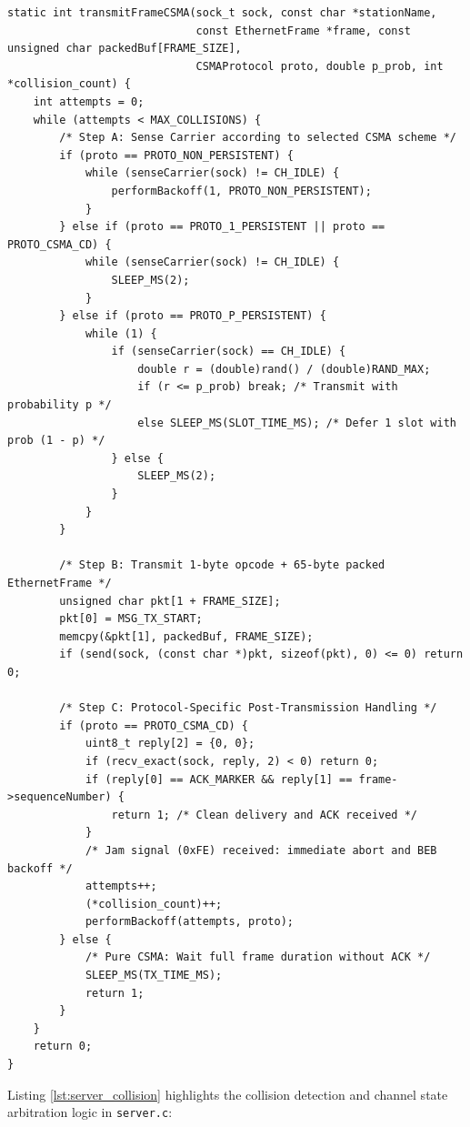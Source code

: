 \documentclass[11pt,a4paper]{article}
\begin{document}
\begin{lstlisting}[caption={Carrier sensing and CSMA transmission arbitration (\texttt{sender.c}).}, label={lst:csma_sender}]
static int transmitFrameCSMA(sock_t sock, const char *stationName,
                             const EthernetFrame *frame, const unsigned char packedBuf[FRAME_SIZE],
                             CSMAProtocol proto, double p_prob, int *collision_count) {
    int attempts = 0;
    while (attempts < MAX_COLLISIONS) {
        /* Step A: Sense Carrier according to selected CSMA scheme */
        if (proto == PROTO_NON_PERSISTENT) {
            while (senseCarrier(sock) != CH_IDLE) {
                performBackoff(1, PROTO_NON_PERSISTENT);
            }
        } else if (proto == PROTO_1_PERSISTENT || proto == PROTO_CSMA_CD) {
            while (senseCarrier(sock) != CH_IDLE) {
                SLEEP_MS(2);
            }
        } else if (proto == PROTO_P_PERSISTENT) {
            while (1) {
                if (senseCarrier(sock) == CH_IDLE) {
                    double r = (double)rand() / (double)RAND_MAX;
                    if (r <= p_prob) break; /* Transmit with probability p */
                    else SLEEP_MS(SLOT_TIME_MS); /* Defer 1 slot with prob (1 - p) */
                } else {
                    SLEEP_MS(2);
                }
            }
        }

        /* Step B: Transmit 1-byte opcode + 65-byte packed EthernetFrame */
        unsigned char pkt[1 + FRAME_SIZE];
        pkt[0] = MSG_TX_START;
        memcpy(&pkt[1], packedBuf, FRAME_SIZE);
        if (send(sock, (const char *)pkt, sizeof(pkt), 0) <= 0) return 0;

        /* Step C: Protocol-Specific Post-Transmission Handling */
        if (proto == PROTO_CSMA_CD) {
            uint8_t reply[2] = {0, 0};
            if (recv_exact(sock, reply, 2) < 0) return 0;
            if (reply[0] == ACK_MARKER && reply[1] == frame->sequenceNumber) {
                return 1; /* Clean delivery and ACK received */
            }
            /* Jam signal (0xFE) received: immediate abort and BEB backoff */
            attempts++;
            (*collision_count)++;
            performBackoff(attempts, proto);
        } else {
            /* Pure CSMA: Wait full frame duration without ACK */
            SLEEP_MS(TX_TIME_MS);
            return 1;
        }
    }
    return 0;
}
\end{lstlisting}

Listing \ref{lst:server_collision} highlights the collision detection and channel state arbitration logic in \texttt{server.c}:
\end{document}
